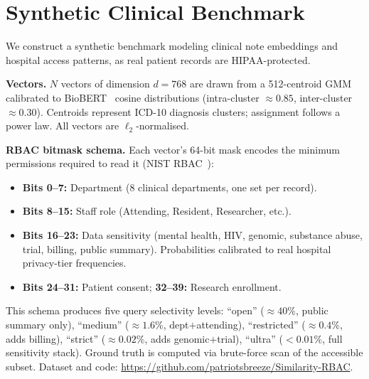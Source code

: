 \section{Synthetic Clinical Benchmark}
\label{sec:dataset}

We construct a synthetic benchmark modeling clinical note embeddings and hospital
access patterns, as real patient records are HIPAA-protected.

\noindent\textbf{Vectors.}
$N$ vectors of dimension $d\!=\!768$ are drawn from a 512-centroid GMM
calibrated to BioBERT~\cite{lee2020biobert} cosine distributions
(intra-cluster ${\approx}0.85$, inter-cluster ${\approx}0.30$).
Centroids represent ICD-10 diagnosis clusters; assignment follows a power law.
All vectors are $\ell_2$-normalised.

\noindent\textbf{RBAC bitmask schema.}
Each vector's 64-bit mask encodes the minimum permissions required to read it
(NIST RBAC~\cite{ferraiolo2001proposed}):
\begin{itemize}[leftmargin=1.4em, itemsep=1pt, topsep=2pt]
  \item \textbf{Bits 0--7:} Department (8 clinical departments, one set per record).
  \item \textbf{Bits 8--15:} Staff role (Attending, Resident, Researcher, etc.).
  \item \textbf{Bits 16--23:} Data sensitivity (mental health, HIV, genomic,
        substance abuse, trial, billing, public summary).
        Probabilities calibrated to real hospital privacy-tier frequencies.
  \item \textbf{Bits 24--31:} Patient consent; \textbf{32--39:} Research enrollment.
\end{itemize}

\noindent This schema produces five query selectivity levels:
``open'' (${\approx}40\%$, public summary only),
``medium'' (${\approx}1.6\%$, dept$+$attending),
``restricted'' (${\approx}0.4\%$, adds billing),
``strict'' (${\approx}0.02\%$, adds genomic$+$trial),
``ultra'' ($<0.01\%$, full sensitivity stack).
Ground truth is computed via brute-force scan of the accessible subset.
Dataset and code: \url{https://github.com/patriotsbreeze/Similarity-RBAC}.
